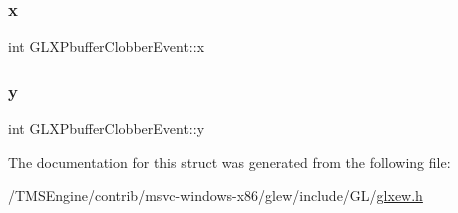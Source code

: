 \subsubsection{\texorpdfstring{x}{x}}
{\footnotesize\ttfamily int G\+L\+X\+Pbuffer\+Clobber\+Event\+::x}

\mbox{\label{struct_g_l_x_pbuffer_clobber_event_a69eb7ac60d36ac3ec4550ac206cfc61f}} 
\subsubsection{\texorpdfstring{y}{y}}
{\footnotesize\ttfamily int G\+L\+X\+Pbuffer\+Clobber\+Event\+::y}



The documentation for this struct was generated from the following file\+:\begin{DoxyCompactItemize}
\item 
/\+T\+M\+S\+Engine/contrib/msvc-\/windows-\/x86/glew/include/\+G\+L/\hyperlink{glxew_8h}{glxew.\+h}\end{DoxyCompactItemize}
